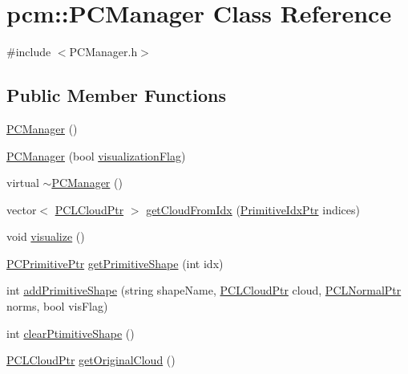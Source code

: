 \hypertarget{classpcm_1_1PCManager}{\section{pcm\-:\-:P\-C\-Manager Class Reference}
\label{classpcm_1_1PCManager}
}


{\ttfamily \#include $<$P\-C\-Manager.\-h$>$}

\subsection*{Public Member Functions}
\begin{DoxyCompactItemize}
\item 
\hyperlink{classpcm_1_1PCManager_ac9edd680fe7b6e9d8a2358ae8641759e}{P\-C\-Manager} ()
\item 
\hyperlink{classpcm_1_1PCManager_af9dabc49537fa4521e7de8323a686856}{P\-C\-Manager} (bool \hyperlink{classpcm_1_1PCManager_af2215813be83c41ca788a40614c9fadb}{visualization\-Flag})
\item 
virtual \hyperlink{classpcm_1_1PCManager_a488397e09fc7593a54d359ca899d6111}{$\sim$\-P\-C\-Manager} ()
\item 
vector$<$ \hyperlink{PCPrimitive_8h_aa14a240c8d999c4f56133c0f70e88783}{P\-C\-L\-Cloud\-Ptr} $>$ \hyperlink{classpcm_1_1PCManager_a73da6d454214f5ba90d978b50ff4438f}{get\-Cloud\-From\-Idx} (\hyperlink{PCPrimitive_8h_a6ec0f6fbb026ae4b66cac121673c3a8a}{Primitive\-Idx\-Ptr} indices)
\item 
void \hyperlink{classpcm_1_1PCManager_ad73afae724cbba84e40ed94ac4123864}{visualize} ()
\item 
\hyperlink{PCManager_8h_a0976ac6881bc2fcf1a5503663203e83f}{P\-C\-Primitive\-Ptr} \hyperlink{classpcm_1_1PCManager_a3575801a21b3fd9613dd57cb97ffaa47}{get\-Primitive\-Shape} (int idx)
\item 
int \hyperlink{classpcm_1_1PCManager_a121d34f52021c5aed1e5133688df8774}{add\-Primitive\-Shape} (string shape\-Name, \hyperlink{PCPrimitive_8h_aa14a240c8d999c4f56133c0f70e88783}{P\-C\-L\-Cloud\-Ptr} cloud, \hyperlink{PCPrimitive_8h_a1bc38ce8b0c26e5f2d28fae9f3e3ea97}{P\-C\-L\-Normal\-Ptr} norms, bool vis\-Flag)
\item 
int \hyperlink{classpcm_1_1PCManager_a993ec5fee41e0ce3b4f9ce403c86aaec}{clear\-Ptimitive\-Shape} ()
\item 
\hyperlink{PCPrimitive_8h_aa14a240c8d999c4f56133c0f70e88783}{P\-C\-L\-Cloud\-Ptr} \hyperlink{classpcm_1_1PCManager_a3f26dafa3a2808b3ee927d9724f9c9a6}{get\-Original\-Cloud} ()

\end{DoxyCompactItemize}
